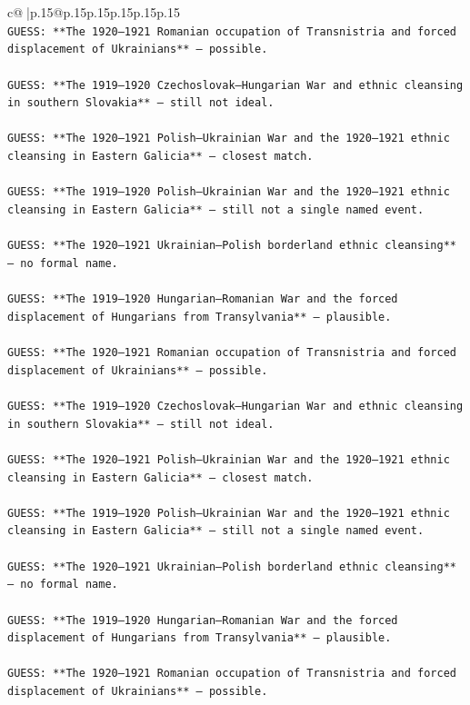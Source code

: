 \documentclass{article}
\begin{document}
{\begin{supertabular}{c@{$\;$}|p{.15\linewidth}@{}p{.15\linewidth}p{.15\linewidth}p{.15\linewidth}p{.15\linewidth}p{.15\linewidth}}
{{{\\ 
\texttt{GUESS: **The 1920–1921 Romanian occupation of Transnistria and forced displacement of Ukrainians** — possible.} \\
\\ 
\texttt{GUESS: **The 1919–1920 Czechoslovak–Hungarian War and ethnic cleansing in southern Slovakia** — still not ideal.} \\
\\ 
\texttt{GUESS: **The 1920–1921 Polish–Ukrainian War and the 1920–1921 ethnic cleansing in Eastern Galicia** — closest match.} \\
\\ 
\texttt{GUESS: **The 1919–1920 Polish–Ukrainian War and the 1920–1921 ethnic cleansing in Eastern Galicia** — still not a single named event.} \\
\\ 
\texttt{GUESS: **The 1920–1921 Ukrainian–Polish borderland ethnic cleansing** — no formal name.} \\
\\ 
\texttt{GUESS: **The 1919–1920 Hungarian–Romanian War and the forced displacement of Hungarians from Transylvania** — plausible.} \\
\\ 
\texttt{GUESS: **The 1920–1921 Romanian occupation of Transnistria and forced displacement of Ukrainians** — possible.} \\
\\ 
\texttt{GUESS: **The 1919–1920 Czechoslovak–Hungarian War and ethnic cleansing in southern Slovakia** — still not ideal.} \\
\\ 
\texttt{GUESS: **The 1920–1921 Polish–Ukrainian War and the 1920–1921 ethnic cleansing in Eastern Galicia** — closest match.} \\
\\ 
\texttt{GUESS: **The 1919–1920 Polish–Ukrainian War and the 1920–1921 ethnic cleansing in Eastern Galicia** — still not a single named event.} \\
\\ 
\texttt{GUESS: **The 1920–1921 Ukrainian–Polish borderland ethnic cleansing** — no formal name.} \\
\\ 
\texttt{GUESS: **The 1919–1920 Hungarian–Romanian War and the forced displacement of Hungarians from Transylvania** — plausible.} \\
\\ 
\texttt{GUESS: **The 1920–1921 Romanian occupation of Transnistria and forced displacement of Ukrainians** — possible.} \\
}}}
\end{supertabular}}
\end{document}
